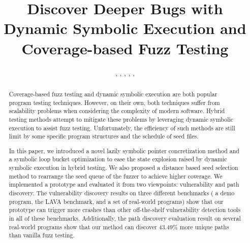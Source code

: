 \documentclass{cta-author}
\begin{document}

\title{Discover Deeper Bugs with Dynamic Symbolic Execution and Coverage-based Fuzz Testing}

\author{, , , , ,  }
%
\address{
}

\begin{abstract}
Coverage-based fuzz testing and dynamic symbolic execution are both popular program testing techniques. However, on their own, both techniques suffer from scalability problems when considering the complexity of modern software. Hybrid testing methods attempt to mitigate these problems by leveraging dynamic symbolic execution to assist fuzz testing. Unfortunately, the efficiency of such methods are still limit by some specific program structures and the schedule of seed files.

In this paper, we introduced a novel lazily symbolic pointer concretization method and a symbolic loop bucket optimization to ease the state explosion raised by dynamic symbolic execution in hybrid testing.
We also proposed a distance based seed selection method to rearrange the seed queue of the fuzzer to achieve higher coverage. We implemented a prototype and evaluated it from two viewpoints: vulnerability and path discovery. 
The vulnerability discovery results on three different benchmarks (
a demo program, the LAVA benchmark, and a set of real-world programs) show that our prototype can trigger more crashes than other off-the-shelf vulnerability detection tools in all of these benchmarks. Additionally, the path discovery evaluation result on several real-world programs show that our method can discover 43.49\% more unique paths than vanilla fuzz testing.
\end{abstract}

\maketitle
\end{document}
